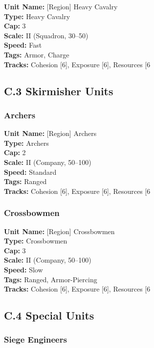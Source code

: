 \documentclass[11pt]{article}
\begin{document}
\textbf{Unit Name:} [Region] Heavy Cavalry\\
\textbf{Type:} Heavy Cavalry\\
\textbf{Cap:} 3\\
\textbf{Scale:} II (Squadron, 30–50)\\
\textbf{Speed:} Fast\\
\textbf{Tags:} Armor, Charge\\
\textbf{Tracks:} Cohesion [6], Exposure [6], Resources [6

\subsection{C.3 Skirmisher Units}

\subsubsection{Archers}

\textbf{Unit Name:} [Region] Archers\\
\textbf{Type:} Archers\\
\textbf{Cap:} 2\\
\textbf{Scale:} II (Company, 50–100)\\
\textbf{Speed:} Standard\\
\textbf{Tags:} Ranged\\
\textbf{Tracks:} Cohesion [6], Exposure [6], Resources [6

\subsubsection{Crossbowmen}

\textbf{Unit Name:} [Region] Crossbowmen\\
\textbf{Type:} Crossbowmen\\
\textbf{Cap:} 3\\
\textbf{Scale:} II (Company, 50–100)\\
\textbf{Speed:} Slow\\
\textbf{Tags:} Ranged, Armor-Piercing\\
\textbf{Tracks:} Cohesion [6], Exposure [6], Resources [6

\subsection{C.4 Special Units}

\subsubsection{Siege Engineers}
\end{document}
